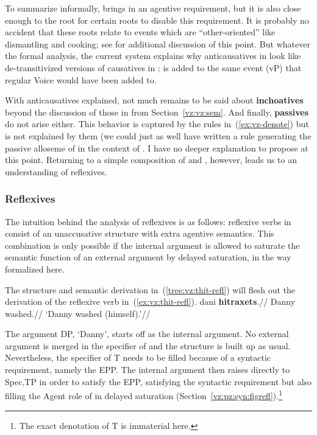 To summarize informally, {\va} brings in an agentive requirement, but it is also close enough to the root for certain roots to disable this requirement. It is probably no accident that these roots relate to events which are ``other-oriented'' like dismantling and cooking; see \cite{kastner17gjgl} for additional discussion of this point. But whatever the formal analysis, the current system explains why anticausatives in {\thit} look like de-transitivized versions of causatives in {\tpie}: {\vz} is added to the same event (vP) that regular Voice would have been added to.

With anticausatives explained, not much remains to be said about \textbf{inchoatives} beyond the discussion of those in {\tnif} from Section~\ref{vz:vz:sem}. And finally, \textbf{passives} do not arise either. This behavior is captured by the rules in~(\ref{ex:vz-denote}) but is not explained by them (we could just as well have written a rule generating the passive alloseme of {\vz} in the context of {\va}. I have no deeper explanation to propose at this point. Returning to a simple composition of {\vz} and {\va}, however, leads us to an understanding of reflexives.

		\subsubsection{Reflexives} \label{vz:va:vzva:refl}
The intuition behind the analysis of reflexives is as follows: reflexive verbs in {\thit} consist of an unaccusative structure with extra agentive semantics. This combination is only possible if the internal argument is allowed to saturate the semantic function of an external argument by delayed saturation, in the way formalized here.

The structure and semantic derivation in~(\ref{tree:vz:thit-refl}) will flesh out the derivation of the reflexive verb in~(\ref{ex:vz:thit-refl}).
\ex \label{ex:vz:thit-refl}
\begingl
\gla dani \textbf{hitraxets}.//
\glb Danny washed.//
\glft `Danny washed (himself).'//
\endgl
\xe

The argument DP, `Danny', starts off as the internal argument. No external argument is merged in the specifier of {\vz} and the structure is built up as usual. Nevertheless, the specifier of T needs to be filled because of a syntactic requirement, namely the EPP. The internal argument then raises directly to Spec,TP in order to satisfy the EPP, satisfying the syntactic requirement but also filling the Agent role of {\vz} in delayed saturation (Section~\ref{vz:pz:syn:figrefl}).\footnote{The exact denotation of T is immaterial here.}

